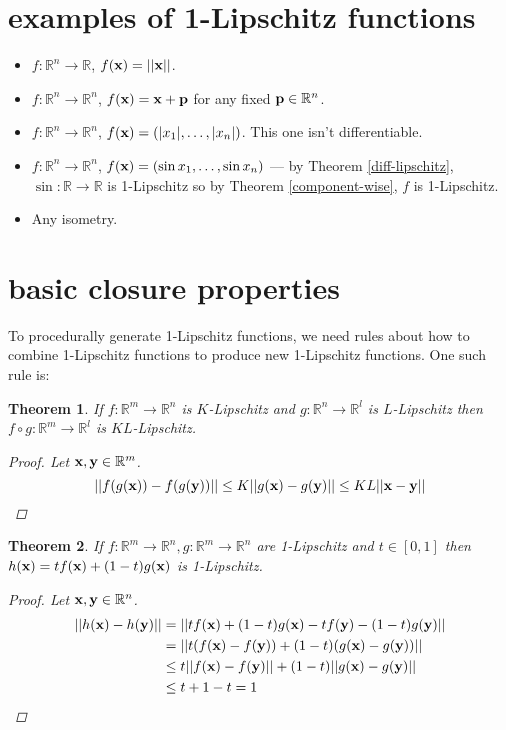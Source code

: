 \documentclass{article}
\newcommand\bb\mathbb
\renewcommand\vec\textbf
\newtheorem{theorem}{Theorem}
\begin{document}
\section{examples of 1-Lipschitz functions}

\begin{itemize}
\item $f:\bb R^n\to \bb R$, $f(\vec x) = ||\vec x||$.
\item $f:\bb R^n\to \bb R^n$, $f(\vec x) = \vec x + \vec p$ for any fixed $\vec p\in\bb R^n$.
\item $f:\bb R^n\to \bb R^n$, $f(\vec x) = (|x_1|,\dots,|x_n|)$. This one isn't differentiable.
\item $f:\bb R^n\to\bb R^n$, $f(\vec x) = (\sin x_1,\dots,\sin x_n)$ --- by Theorem \ref{diff-lipschitz},
$\sin:\bb R\to\bb R$ is 1-Lipschitz so by Theorem \ref{component-wise}, $f$ is 1-Lipschitz.
\item Any isometry.
\end{itemize}

\section{basic closure properties}

To procedurally generate 1-Lipschitz functions, we need rules about how to combine 1-Lipschitz
functions to produce new 1-Lipschitz functions.
One such rule is:

\begin{theorem}
\label{composition}
If $f : \bb R^m \to \bb R^n$ is $K$-Lipschitz and $g:\bb R^n\to\bb R^l$ is $L$-Lipschitz then
 $f\circ g:\bb R^m\to\bb R^l$ is $KL$-Lipschitz.
\begin{proof}
Let $\vec x,\vec y\in\bb R^m$.
$$||f(g(\vec x)) - f(g(\vec y))|| \leq K||g(\vec x) - g(\vec y)|| \leq KL||\vec x - \vec y||$$
\end{proof}
\end{theorem}

\begin{theorem}
\label{mixing}
If $f : \bb R^m \to \bb R^n,g:\bb R^m\to\bb R^n$ are 1-Lipschitz and $t\in[0,1]$ then
$h(\vec x) = tf(\vec x) + (1-t)g(\vec x)$ is 1-Lipschitz.
\begin{proof}
Let $\vec x,\vec y\in\bb R^n$.
\begin{align*}
||h(\vec x) - h(\vec y)|| &= ||tf(\vec x) + (1-t)g(\vec x) - tf(\vec y) - (1-t)g(\vec y)||\\
&= ||t(f(\vec x) - f(\vec y)) + (1-t)(g(\vec x) - g(\vec y))||\\
&\leq t||f(\vec x) - f(\vec y)|| + (1-t)||g(\vec x) - g(\vec y)||\\
&\leq t + 1 - t = 1
\end{align*}
\end{proof}
\end{theorem}
\end{document}
